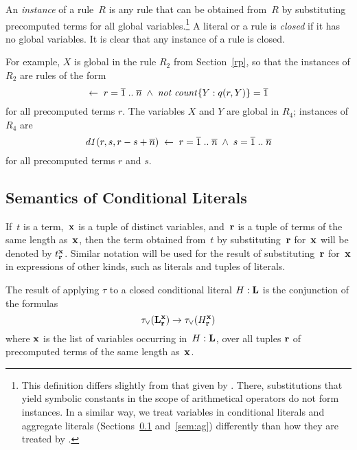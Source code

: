 \documentclass{tlp}
\def\ar{\leftarrow}
\def\rar{\rightarrow}
\def\no{{\it not}}
\begin{document}
An {\sl instance} of a rule~$R$ is any 
rule that can be obtained from~$R$ by substituting 
precomputed terms for all global variables.\footnote{\label{ft2} This
definition
differs slightly from that given by  
\citeyear[Section~3.3]{har14a}. There, 
substitutions that yield symbolic constants in the scope of arithmetical 
operators do not form instances.
In a similar way, we treat variables in conditional literals
and aggregate literals (Sections~\ref{sem:cond} and~\ref{sem:ag}) differently
than how they are treated by  \citeyear{har14a}.}
A literal or a rule is {\sl closed} if
it has no global variables. It is clear that any instance of a rule is closed.

For example, $X$ is global in the rule $R_2$ from Section~\ref{rp},
so that the instances of $R_2$ are rules of the form
$$
\ar \; r = \overline 1\;..\;\overline n \; \land \; \no \; {\it count}\{ Y : q(r,Y) \} = \overline 1
$$
for all precomputed terms $r$. 
The variables $X$ and $Y$ are global in $R_4$; instances of $R_4$ are
$$
{\it d1}(r, s, r- s+\overline n) \; \ar \;  r = \overline 1\;..\;\overline n \; \land \; 
 s = \overline 1\;..\;\overline n
$$
for all precomputed terms $r$ and $s$. 
\subsection{Semantics of Conditional Literals}\label{sem:cond}

If~$t$ is a term,~${\bf x}$ is a tuple of distinct variables, and~${\bf r}$ is
a tuple of terms of the same length as~${\bf x}$, then the term obtained
from~$t$ by substituting~${\bf r}$
for~${\bf x}$ will be denoted by $t^{\bf x}_{\bf r}$.  Similar notation will be
used for the result of substituting~${\bf r}$ for~${\bf x}$ in expressions of
other kinds, such as literals and tuples of literals.

The result of applying $\tau$ to a closed conditional literal $H : {\bf L}$  
is the conjunction of the formulas
$$\tau_{\lor} ({\bf L}^{\bf x}_{\bf r})\rar \tau_{\lor}(H^{\bf x}_{\bf r})$$
where ${\bf x}$ is the list of variables occurring in~$H : {\bf L}$,
over all tuples ${\bf r}$ of precomputed terms of the same length as~${\bf
x}$. 
\end{document}

